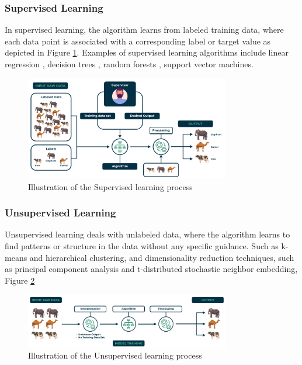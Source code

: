 \subsubsection{Supervised Learning}
In supervised learning, the algorithm learns from labeled training data, where each data point is associated with a corresponding label or target value as depicted in Figure \ref{fig:superml}. Examples of supervised learning algorithms include linear regression , decision trees , random forests , support vector machines.

\begin{figure}[H]
  \centering
  \includegraphics[width=0.8\textwidth]{Images/Chapter1/superml.png}
  \caption{Illustration of the Supervised learning process \cite{geeksforgeeks2025supervised}}
  \label{fig:superml}
\end{figure}

\subsubsection{Unsupervised Learning}
Unsupervised learning deals with unlabeled data, where the algorithm learns to find patterns or
structure in the data without any specific guidance. Such as k-means and hierarchical
clustering, and dimensionality reduction techniques, such as principal component analysis
and t-distributed stochastic neighbor embedding,  Figure \ref{fig:unsuperml}
\begin{figure}[H]
  \centering
  \includegraphics[width=0.8\textwidth]{Images/Chapter1/unsuperml.png}
  \caption{Illustration of the Unsupervised learning process \cite{geeksforgeeks2025supervised} }
  \label{fig:unsuperml}
\end{figure}

